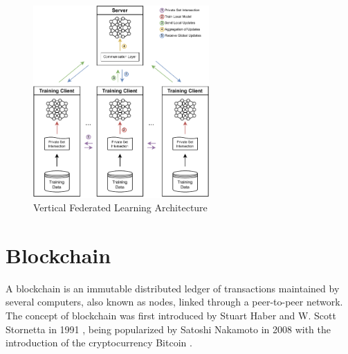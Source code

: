 \begin{figure}[t] %
    \centering
    \centering
    \includegraphics[width=0.6\textwidth]{graphics/vfl-architecture.pdf}
    \caption{Vertical Federated Learning Architecture}
    \label{fig:vfl_arch}
\end{figure}



\section{Blockchain}\label{fundamentals:blockchain}

A blockchain is an immutable distributed ledger of transactions maintained by several computers, also known as nodes, linked through a peer-to-peer network. The concept of blockchain was first introduced by Stuart Haber and W. Scott Stornetta in 1991 \cite{10.48550/ARXIV.1810.06130}, being popularized by Satoshi Nakamoto in 2008 with the introduction of the cryptocurrency Bitcoin \cite{nakamoto2009bitcoin}.

